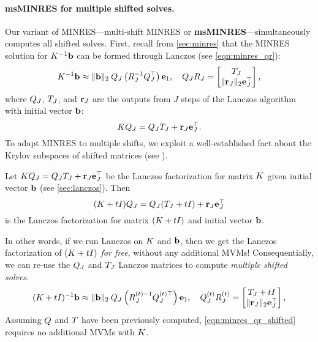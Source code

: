 \paragraph{msMINRES for multiple shifted solves.}
Our variant of MINRES---multi-shift MINRES or {\bf msMINRES}---simultaneously computes all shifted solves.
First, recall from \cref{sec:minres} that the MINRES solution for $K^{-1} \mathbf{b}$ can be formed through Lanczos (see \cref{eqn:minres_qr}):
\begin{equation}
  K^{-1} \mathbf{b} \approx \Vert \mathbf{b} \Vert_2 \: Q_J \left( R^{-1}_J Q_J^\top \right) \mathbf{e}_1,
  \quad
  Q_J R_J = \begin{bmatrix} T_J \\ \Vert \mathbf{r}_J \Vert_2 \mathbf{e}_J^\top \end{bmatrix},
  \label{eqn:minres_qr2}
\end{equation}
where $Q_J$, $T_J$, and $\mathbf{r}_J$ are the outputs from $J$ steps of the Lanczos algorithm with initial vector $\mathbf{b}$:
\[
  K Q_J = Q_J T_J + \mathbf{r}_J \mathbf{e}_J^\top.
\]
To adapt MINRES to multiple shifts, we exploit a well-established fact about the Krylov subspaces of shifted matrices (see \citep[e.g.][]{jegerlehner1996krylov}).
%
\begin{observation}
  Let $K Q_J = Q_J T_J + \mathbf{r}_J \mathbf{e}_J^\top$ be the Lanczos factorization for matrix $K$ given initial vector $\mathbf{b}$ (see \cref{sec:lanczos}).
  Then $$(K + t I) Q_J = Q_J (T_J + t I) + \mathbf{r}_J \mathbf{e}_J^\top$$ is the Lanczos factorization for matrix $(K + t I)$ and initial vector $\mathbf{b}$.
\end{observation}
%
\noindent
In other words, if we run Lanczos on $K$ and $\mathbf{b}$, then we get the Lanczos factorization of $(K + t I)$ \emph{for free}, without any additional MVMs!
Consequentially, we can re-use the $Q_J$ and $T_J$ Lanczos matrices to compute \emph{multiple shifted solves.}
%
\begin{equation}
  (K + t I)^{-1} \mathbf{b} \approx \Vert \mathbf{b} \Vert_2 \: Q_J \left( R^{(t){-1}}_J Q_J^{(t)\top} \right) \mathbf{e}_1,
  \quad
  Q_J^{(t)} R_J^{(t)} = \begin{bmatrix} T_J + t I \\ \Vert \mathbf{r}_J \Vert_2 \mathbf{e}_J^\top \end{bmatrix},
  \label{eqn:minres_qr_shifted}
\end{equation}
%
Assuming $Q$ and $T$ have been previously computed, \cref{eqn:minres_qr_shifted} requires no additional MVMs with $K$.

